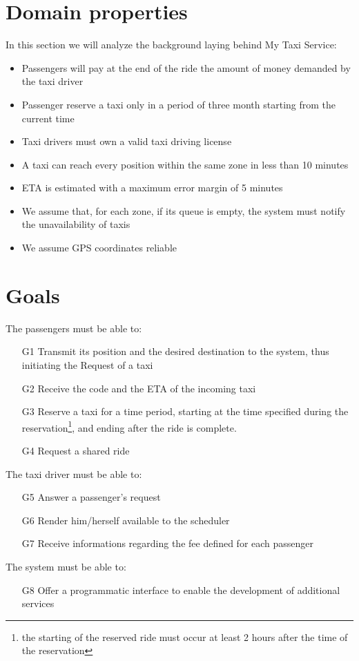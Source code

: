 \section{Domain properties}
In this section we will analyze the background laying behind My Taxi Service:
\begin{itemize}
  \item Passengers will pay at the end of the ride the amount of money demanded by the taxi driver
  \item Passenger reserve a taxi only in a period of three month starting from the current time
  \item Taxi drivers must own a valid taxi driving license
  \item A taxi can reach every position within the same zone in less than 10 minutes
  \item ETA is estimated with a maximum error margin of 5 minutes
  \item We assume that, for each zone, if its queue is empty, the system must notify the unavailability of taxis
  \item We assume GPS coordinates reliable
\end{itemize}
\section{Goals}
The passengers must be able to:
\begin{itemize}
  \item [G1] Transmit its position and the desired destination to the system, thus initiating the Request of a taxi
  \item [G2] Receive the code and the ETA of the incoming taxi
  \item [G3] Reserve a taxi for a time period, starting at the time specified during the reservation\footnote{the starting of the
  reserved ride must occur at least 2 hours after the time of the reservation}, and ending after the ride is complete.
  \item [G4] Request a shared ride
\end{itemize}
The taxi driver must be able to:
\begin{itemize}
  \item [G5] Answer a passenger's request
  \item [G6] Render him/herself available to the scheduler
  \item [G7] Receive informations regarding the fee defined for each passenger
\end{itemize}
The system must be able to:
\begin{itemize}
  \item [G8] Offer a programmatic interface to enable the development of additional services
\end{itemize}


